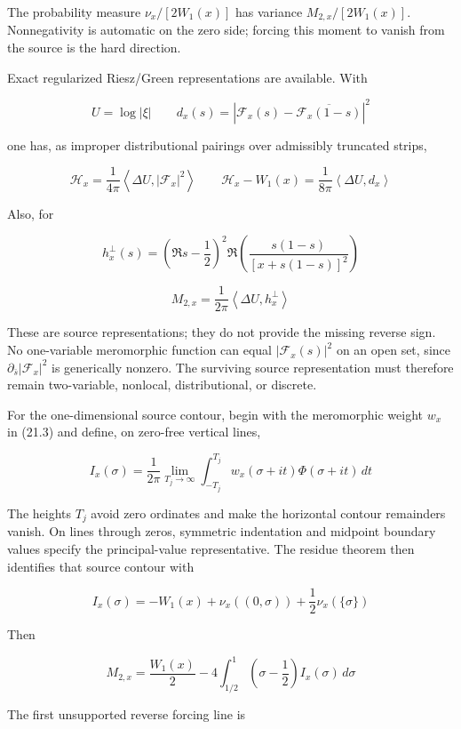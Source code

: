 \documentclass[
  11pt,
]{book}
\begin{document}
The probability measure \(\nu_x/[2W_1(x)]\) has variance
\(M_{2,x}/[2W_1(x)]\). Nonnegativity is automatic on the zero side;
forcing this moment to vanish from the source is the hard direction.

Exact regularized Riesz/Green representations are available. With

\[
U=\log|\xi|
\qquad
d_x(s)=\left|\mathcal F_x(s)
-\overline{\mathcal F_x(1-s)}\right|^2
\tag{21.8}
\]

one has, as improper distributional pairings over admissibly truncated
strips,

\[
\boxed{
\mathscr H_x=\frac1{4\pi}
\left\langle\Delta U,|\mathcal F_x|^2\right\rangle
\qquad
\mathscr H_x-W_1(x)=\frac1{8\pi}
\left\langle\Delta U,d_x\right\rangle}
\tag{21.9}
\]

Also, for

\[
h_x^{\perp}(s)=
\left(\Re s-\frac12\right)^2
\Re\!\left(\frac{s(1-s)}{[x+s(1-s)]^2}\right)
\tag{21.10}
\]

\[
\boxed{M_{2,x}=\frac1{2\pi}
\left\langle\Delta U,h_x^{\perp}\right\rangle}
\tag{21.11}
\]

These are source representations; they do not provide the missing
reverse sign. No one-variable meromorphic function can equal
\(|\mathcal F_x(s)|^2\) on an open set, since
\(\partial_{\bar s}|\mathcal F_x|^2\) is generically nonzero. The
surviving source representation must therefore remain two-variable,
nonlocal, distributional, or discrete.

For the one-dimensional source contour, begin with the meromorphic
weight \(w_x\) in (21.3) and define, on zero-free vertical lines,

\[
I_x(\sigma)=\frac1{2\pi}\lim_{T_j\to\infty}
\int_{-T_j}^{T_j}w_x(\sigma+it)\Phi(\sigma+it)\,dt
\tag{21.12a}
\]

The heights \(T_j\) avoid zero ordinates and make the horizontal contour
remainders vanish. On lines through zeros, symmetric indentation and
midpoint boundary values specify the principal-value representative. The
residue theorem then identifies that source contour with

\[
I_x(\sigma)=-W_1(x)+\nu_x((0,\sigma))
+\frac12\nu_x(\{\sigma\})
\tag{21.12}
\]

Then

\[
\boxed{
M_{2,x}=\frac{W_1(x)}2
-4\int_{1/2}^{1}\left(\sigma-\frac12\right)I_x(\sigma)\,d\sigma}
\tag{21.13}
\]

The first unsupported reverse forcing line is
\end{document}
